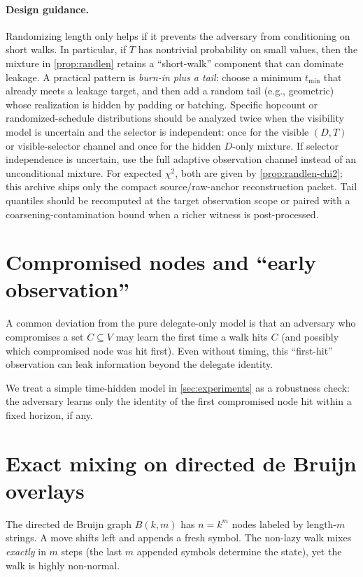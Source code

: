 \documentclass[11pt]{article}
\begin{document}
\paragraph{Design guidance.}
Randomizing length only helps if it prevents the adversary from conditioning on
short walks. In particular, if $T$ has nontrivial probability on small values,
then the mixture in \cref{prop:randlen} retains a ``short-walk'' component that
can dominate leakage. A practical pattern is \emph{burn-in plus a tail}:
choose a minimum $t_{\min}$ that already meets a leakage target, and then add a
random tail (e.g., geometric) whose realization is hidden by padding or batching.
Specific hopcount or randomized-schedule distributions should be analyzed twice when the visibility
model is uncertain and the selector is independent: once for the visible $(D,T)$ or visible-selector channel and once for the hidden
$D$-only mixture.  If selector independence is uncertain, use the full adaptive observation channel instead of an unconditional mixture.  For expected $\chi^2$, both are given by
\cref{prop:randlen-chi2}; this archive ships only the compact source/raw-anchor
reconstruction packet.  Tail quantiles should be recomputed at the target observation scope or paired with a coarsening-contamination bound when a richer witness is post-processed.

\section{Compromised nodes and ``early observation''}\label{sec:compromise}
A common deviation from the pure delegate-only model is that an adversary who
compromises a set $C\subseteq V$ may learn the first time a walk hits $C$ (and
possibly which compromised node was hit first). Even without timing, this
``first-hit'' observation can leak information beyond the delegate identity.

We treat a simple time-hidden model in \cref{sec:experiments} as a robustness
check: the adversary learns only the identity of the first compromised node hit
within a fixed horizon, if any.

\section{Exact mixing on directed de Bruijn overlays}\label{sec:debruijn}
The directed de Bruijn graph $B(k,m)$ has $n=k^m$ nodes labeled by length-$m$
strings. A move shifts left and appends a fresh symbol. The non-lazy walk mixes
\emph{exactly} in $m$ steps (the last $m$ appended symbols determine the state),
yet the walk is highly non-normal.
\end{document}
